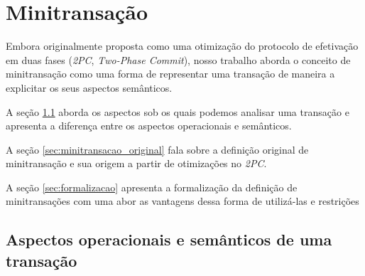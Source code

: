 \documentclass[11pt,twoside,a4paper]{book}
\begin{document}
\chapter{Minitransação}
\label{chap:minitransacao}

Embora originalmente proposta como uma otimização do protocolo de efetivação em duas fases (\emph{2PC}, \emph{Two-Phase Commit}), nosso trabalho aborda o conceito de minitransação como uma forma de representar uma transação de maneira a explicitar os seus aspectos semânticos.

A seção \ref{sec:aspectos_operacionais_e_semanticos} aborda os aspectos sob os quais podemos analisar uma transação e apresenta a diferença entre os aspectos operacionais e semânticos.

A seção \ref{sec:minitransacao_original} fala sobre a definição original de minitransação e sua origem a partir de otimizações no \emph{2PC}.

A seção \ref{sec:formalizacao} apresenta a formalização da definição de minitransações com uma abor as vantagens dessa forma de utilizá-las e restrições 





\section{Aspectos operacionais e semânticos de uma transação}
\label{sec:aspectos_operacionais_e_semanticos}
\end{document}
